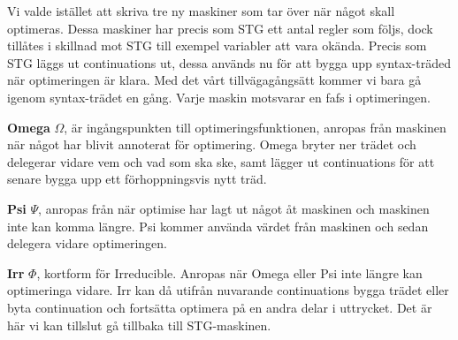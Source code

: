 \documentclass[Rapport]{subfiles}
\begin{document}
Vi valde istället att skriva tre ny maskiner som tar över när något skall optimeras.
Dessa maskiner har precis som STG ett antal regler som följs, dock tillåtes i skillnad mot STG till exempel variabler att 
vara okända. Precis som STG läggs ut continuations ut, dessa används nu för att bygga upp syntax-träded när optimeringen är klara. Med det vårt tillvägagångsätt kommer vi bara gå igenom syntax-trädet en gång.
Varje maskin motsvarar en fafs i optimeringen.


\textbf{Omega} $\Omega$, är ingångspunkten till optimeringsfunktionen, anropas från maskinen
när något har blivit annoterat för optimering. Omega bryter ner trädet
och delegerar vidare vem och vad som ska ske, samt lägger ut continuations
för att senare bygga upp ett förhoppningsvis nytt träd.

\textbf{Psi} $\Psi$, anropas från när optimise har lagt ut något åt maskinen och
maskinen inte kan komma längre. Psi kommer använda värdet från maskinen
och sedan delegera vidare optimeringen.

\textbf{Irr} $\Phi$, kortform för Irreducible. Anropas när Omega eller Psi inte längre
kan optimeringa vidare. Irr kan då utifrån nuvarande continuations
bygga trädet eller byta continuation och fortsätta optimera på en
andra delar i uttrycket. Det är här vi kan tillslut gå tillbaka till
STG-maskinen.














\end{document}
